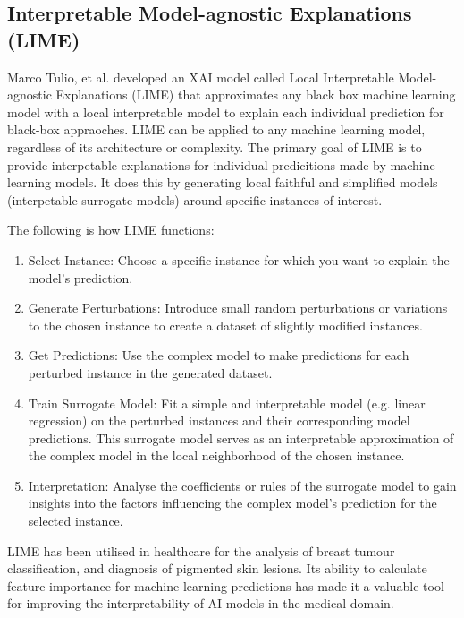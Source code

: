 \subsection{Interpretable Model-agnostic Explanations (LIME)}
Marco Tulio, et al.\cite{} developed an XAI model called Local Interpretable Model-agnostic Explanations (LIME) that approximates any black box machine learning model with a local interpretable model to explain each individual prediction for black-box appraoches. LIME can be applied to any machine learning model, regardless of its architecture or complexity. The primary goal of LIME is to provide interpetable explanations for individual predicitions made by machine learning models. It does this by generating local faithful and simplified models (interpetable surrogate models) around specific instances of interest. 

The following is how LIME functions:

\begin{enumerate}

	\item Select Instance: Choose a specific instance for which you want to explain the model's prediction.

	\item Generate Perturbations: Introduce small random perturbations or variations to the chosen instance to create a dataset of slightly modified instances.

    \item Get Predictions: Use the complex model to make predictions for each perturbed instance in the generated dataset.

    \item Train Surrogate Model: Fit a simple and interpretable model (e.g. linear regression) on the perturbed instances and their corresponding model predictions. This surrogate model serves as an interpretable approximation of the complex model in the local neighborhood of the chosen instance.

    \item Interpretation: Analyse the coefficients or rules of the surrogate model to gain insights into the factors influencing the complex model's prediction for the selected instance.

\end{enumerate}

LIME has been utilised in healthcare for the analysis of breast tumour classification\cite{rafferty2022}, and diagnosis of pigmented skin lesions\cite{duell2021}. Its ability to calculate feature importance for machine learning predictions has made it a valuable tool for improving the interpretability of AI models in the medical domain.


